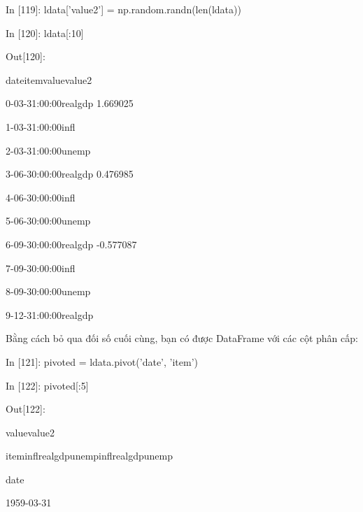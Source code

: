 \par\quad\textup In [119]: ldata['value2'] = np.random.randn(len(ldata))
\par\quad\textup In [120]: ldata[:10]
\par\quad\textup Out[120]:
\par\quad\textup\quad\quad\quad\quad\quad\quad\quad\quad\quad date\quad\quad item\quad\quad value\quad\quad value2
\par\quad\textup 0-03-31:00:00\quad\quad realgdp 1.669025
\par\quad\textup 1-03-31:00:00\quad\quad infl\quad\quad{}
\par\quad\textup 2-03-31:00:00\quad\quad unemp
\par\quad\textup 3-06-30:00:00\quad\quad realgdp 0.476985
\par\quad\textup 4-06-30:00:00\quad\quad infl\quad\quad{}
\par\quad\textup 5-06-30:00:00\quad\quad unemp
\par\quad\textup 6-09-30:00:00\quad\quad realgdp -0.577087
\par\quad\textup 7-09-30:00:00\quad\quad infl\quad\quad{}
\par\quad\textup 8-09-30:00:00\quad\quad unemp
\par\quad\textup 9-12-31:00:00\quad\quad realgdp
\par\quad\textup Bằng cách bỏ qua đối số cuối cùng, bạn có được DataFrame với các cột phân cấp:
\par\quad\textup In [121]: pivoted = ldata.pivot('date', 'item')
\par\quad\textup In [122]: pivoted[:5]
\par\quad\textup Out[122]:
\par\quad\textup\quad\quad\quad\quad\quad\quad  value\quad\quad\quad\quad\quad\quad\quad value2
\par\quad\textup item\quad\quad\quad\quad infl\quad realgdp\quad unemp\quad infl\quad\quad\quad realgdp\quad\quad\quad unemp
\par\quad\textup date
\par\quad\textup 1959-03-31
